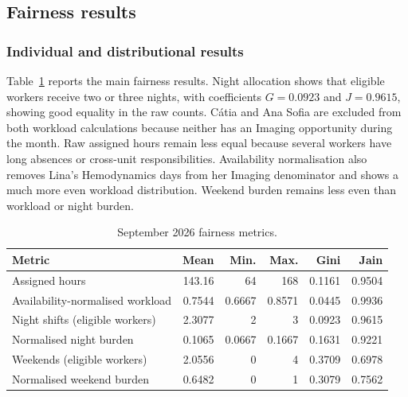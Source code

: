 \documentclass[11pt,a4paper]{article}
\begin{document}
\subsection{Fairness results}

\subsubsection{Individual and distributional results}

Table~\ref{tab:fairness} reports the main fairness results. Night allocation shows that eligible workers receive two or three nights, with coefficients $G=0.0923$ and $J=0.9615$, showing good equality in the raw counts. C\'atia and Ana Sofia are excluded from both workload calculations because neither has an Imaging opportunity during the month. Raw assigned hours remain less equal because several workers have long absences or cross-unit responsibilities. Availability normalisation also removes Lina's Hemodynamics days from her Imaging denominator and shows a much more even workload distribution. Weekend burden remains less even than workload or night burden.

\begin{table}[H]
\centering
\caption{September 2026 fairness metrics.}
\label{tab:fairness}
\begin{tabularx}{\textwidth}{Xrrrrr}
\toprule
Metric & Mean & Min. & Max. & Gini & Jain \\
\midrule
Assigned hours & 143.16 & 64 & 168 & 0.1161 & 0.9504 \\
Availability-normalised workload & 0.7544 & 0.6667 & 0.8571 & 0.0445 & 0.9936 \\
Night shifts (eligible workers) & 2.3077 & 2 & 3 & 0.0923 & 0.9615 \\
Normalised night burden & 0.1065 & 0.0667 & 0.1667 & 0.1631 & 0.9221 \\
Weekends (eligible workers) & 2.0556 & 0 & 4 & 0.3709 & 0.6978 \\
Normalised weekend burden & 0.6482 & 0 & 1 & 0.3079 & 0.7562 \\
\bottomrule
\end{tabularx}
\end{table}
\end{document}
